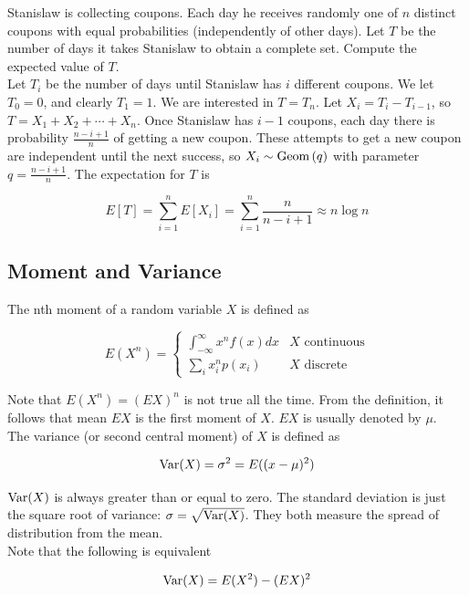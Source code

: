 \begin{texample}
	Stanislaw is collecting coupons. Each day he receives randomly one of $n$ distinct coupons with equal probabilities (independently of other days). Let $T$ be the number of days it takes Stanislaw to obtain a complete set. Compute the expected value of $T$. \\
	
	Let $T_i$ be the number of days until Stanislaw has $i$ different coupons. We let $T_0 = 0$, and clearly $T_1 = 1$. We are interested in $T = T_n$. Let $X_i = T_i-T_{i-1}$, so $T = X_1+X_2+\cdots+X_n$. Once Stanislaw has $i-1$ coupons, each day there is probability $\frac{n-i+1}{n}$ of getting a new coupon. These attempts to get a new coupon are independent until the next success, so $X_i\sim\operatorname{Geom}\left( q \right)$ with parameter $q=\frac{n-i+1}{n}$. The expectation for $T$ is
	
	\[E[T]=\sum_{i=1}^n E[X_i]=\sum_{i=1}^n \frac{n}{n-i+1} \approx n\log n\]
\end{texample}

\subsection{Moment and Variance}

The nth moment of a random variable $X$ is defined as

\[ E(X^n)=\begin{cases} \displaystyle\int_{-\infty}^\infty x^n f(x) dx & \text{$X$ continuous} \\[20pt] \displaystyle\sum_i x_i^n p(x_i) & \text{$X$ discrete} \end{cases} \]

Note that $E(X^n) = (EX)^n$ is not true all the time. From the definition, it follows that mean $EX$ is the first moment of $X$. $EX$ is usually denoted by $\mu$. \\

The variance (or second central moment) of $X$ is defined as

\[ \operatorname{Var}(X)=\sigma^2=E((x-\mu)^2) \]

$\operatorname{Var}(X)$ is always greater than or equal to zero. The standard deviation is just the square root of variance: $\sigma=\sqrt{\operatorname{Var}(X)}$. They both measure the spread of distribution from the mean. \\

Note that the following is equivalent

\[ \operatorname{Var}(X)=E(X^2)-(EX)^2 \]

